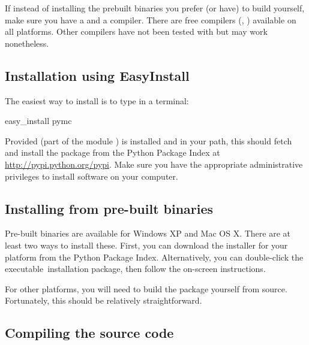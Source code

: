 \documentclass[]{jss}
\begin{document}
If instead of installing the prebuilt binaries you prefer (or have) to build
 yourself, make sure you have a  and a  compiler. There are free
compilers (,  \citep{gcc}) available on all platforms. Other compilers have not been
tested with  but may work nonetheless.



\subsection{Installation using EasyInstall}
  \label{installation-using-easyinstall}%


The easiest way to install  is to type in a terminal:
%
\begin{CodeInput}
easy_install pymc
\end{CodeInput}

Provided  \citep{easyinstall}  (part of the  module \citep{setuptools}) is installed
and in your path, this should fetch and install the package from the
Python Package Index at \href{http://pypi.python.org/pypi}{http://pypi.python.org/pypi}. Make sure you have the appropriate administrative
privileges to install software on your computer.



\subsection{Installing from pre-built binaries}
  \label{installing-from-pre-built-binaries}%


Pre-built binaries are available for Windows XP and Mac OS X. There are at least
two ways to install these. First, you can download the installer for your platform from the Python Package Index. Alternatively, you can double-click the executable~installation package, then follow the
on-screen instructions.

For other platforms, you will need to build the package yourself from source.
Fortunately, this should be relatively straightforward.



\subsection{Compiling the source code}
  \label{compiling-the-source-code}%
\end{document}
